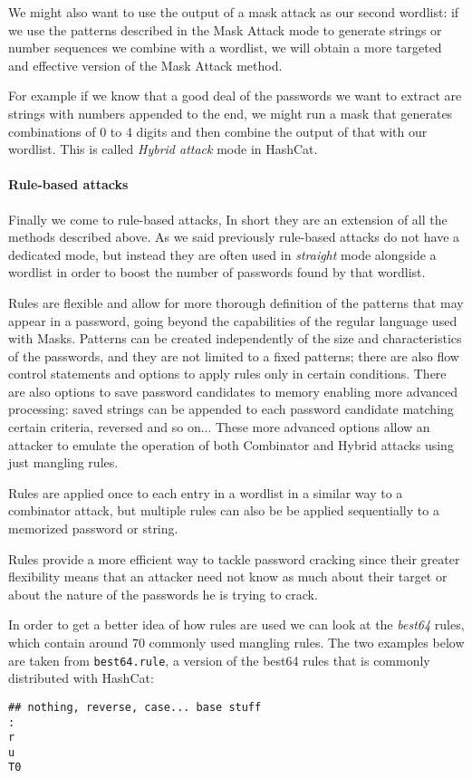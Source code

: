 We might also want to use the output of a mask attack as our second wordlist: if we use the patterns described in the Mask Attack mode to generate strings or number sequences we combine with a wordlist, we will obtain a more targeted and effective version of the Mask Attack method. 

For example if we know that a good deal of the passwords we want to extract are strings with numbers appended to the end, we might run a mask that generates combinations of 0 to 4 digits and then combine the output of that with our wordlist. This is called \emph{Hybrid attack} mode in HashCat.

\paragraph{Rule-based attacks}\label{par:rule-based}
Finally we come to rule-based attacks, In short they are an extension of all the methods described above. 
As we said previously  rule-based attacks do not have a dedicated mode, but instead they are often used in \emph{straight} mode alongside a wordlist in order to boost the number of passwords found by that wordlist.

Rules are flexible and allow for more thorough definition of the patterns that may appear in a password, going beyond the capabilities of the regular language used with Masks.
Patterns can be created independently of the size and characteristics of the passwords, and they are not limited to a fixed patterns; there are also flow control statements and options to apply rules only in certain conditions.
There are also options to save password candidates to memory enabling more advanced processing: saved strings can be appended to each password candidate matching certain criteria, reversed and so on...
These more advanced options allow an attacker to emulate the operation of both Combinator and Hybrid attacks using just mangling rules. 

Rules are applied once to each entry in a wordlist in a similar way to a combinator attack, but multiple rules can also be be applied sequentially to a memorized password or string.

Rules provide a more efficient way to tackle password cracking since their greater flexibility means that an attacker need not know as much about their target or about the nature of the passwords he is trying to crack. 

In order to get a better idea of how rules are used we can look at the \emph{best64} rules, which contain around 70 commonly used mangling rules. The two examples below are taken from \texttt{best64.rule}, a version of the best64 rules that is commonly distributed with HashCat:
\begin{verbatim}
## nothing, reverse, case... base stuff
:
r
u
T0
\end{verbatim}

